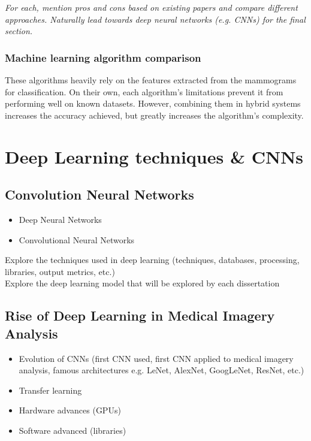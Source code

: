 \textit{For each, mention pros and cons based on existing papers and compare different approaches. Naturally lead towards deep neural networks (e.g. CNNs) for the final section.}

\subsubsection{Machine learning algorithm comparison}

These algorithms heavily rely on the features extracted from the mammograms for classification. On their own, each algorithm's limitations prevent it from performing well on known datasets. However, combining them in hybrid systems increases the accuracy achieved, but greatly increases the algorithm's complexity.


\section{Deep Learning techniques \& CNNs}
\label{sec:litsurvey-DLtechniques-CNN}

\subsection{Convolution Neural Networks}

\begin{itemize}
    \item Deep Neural Networks
    \item Convolutional Neural Networks
\end{itemize}

Explore the techniques used in deep learning (techniques, databases, processing, libraries, output metrics, etc.)\\
Explore the deep learning model that will be explored by each dissertation

\subsection{Rise of Deep Learning in Medical Imagery Analysis}

\begin{itemize}
    \item Evolution of CNNs (first CNN used, first CNN applied to medical imagery analysis, famous architectures e.g. LeNet, AlexNet, GoogLeNet, ResNet, etc.)
    \item Transfer learning
    \item Hardware advances (GPUs)
    \item Software advanced (libraries)
\end{itemize}

